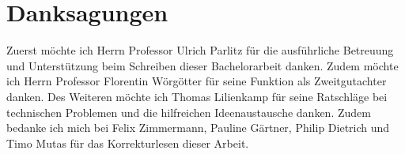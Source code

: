 \chapter{Danksagungen}
Zuerst möchte ich Herrn Professor Ulrich Parlitz für die ausführliche Betreuung und Unterstützung beim Schreiben dieser Bachelorarbeit danken. Zudem möchte ich Herrn Professor Florentin Wörgötter für seine Funktion als Zweitgutachter danken. Des Weiteren möchte ich Thomas Lilienkamp für seine Ratschläge bei technischen Problemen und die hilfreichen Ideenaustausche danken. Zudem bedanke ich mich bei Felix Zimmermann, Pauline Gärtner, Philip Dietrich und Timo Mutas für das Korrekturlesen dieser Arbeit. 